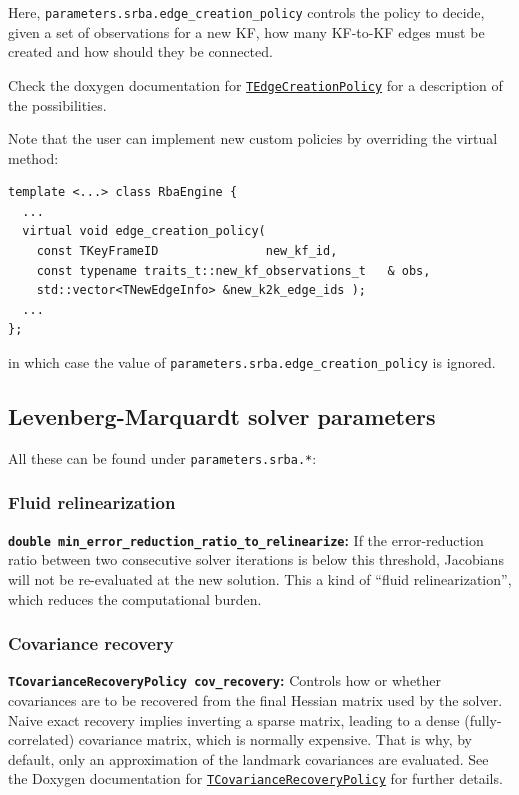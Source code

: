 \documentclass[a4paper,11pt]{article}
\begin{document}
Here, \texttt{parameters.srba.edge\_creation\_policy} controls the policy 
to decide, given a set of observations for a new KF, 
how many KF-to-KF edges must be created and how should they be connected.

Check the doxygen documentation for 
\href{http://reference.mrpt.org/svn/namespacemrpt_1_1srba.html#af0fbe388a6a76d59f66e7b8d1353926c}
{\texttt{TEdgeCreationPolicy}} for a description of the possibilities.

Note that the user can implement new custom policies by overriding the virtual method:

\begin{lstlisting}
template <...> class RbaEngine {
  ...
  virtual void edge_creation_policy(
    const TKeyFrameID               new_kf_id,
    const typename traits_t::new_kf_observations_t   & obs,
    std::vector<TNewEdgeInfo> &new_k2k_edge_ids );
  ...
};
\end{lstlisting}

\noindent in which case the value of 
\texttt{parameters.srba.edge\_creation\_policy}
is ignored.


\newpage
\subsection{Levenberg-Marquardt solver parameters}
\label{sect:lm-params}

All these can be found under
\texttt{parameters.srba.*}:


\subsubsection{Fluid relinearization}

\textbf{\texttt{double min\_error\_reduction\_ratio\_to\_relinearize}:} If the error-reduction ratio 
between two consecutive solver iterations is below this threshold, Jacobians will not be re-evaluated 
at the new solution. This a kind of ``fluid relinearization'', which reduces the computational burden.

\subsubsection{Covariance recovery}

\textbf{\texttt{TCovarianceRecoveryPolicy  cov\_recovery}:} Controls how or whether covariances 
are to be recovered from the final Hessian matrix used by the solver. Naive exact recovery implies 
inverting a sparse matrix, leading to a dense (fully-correlated) covariance matrix, which is normally expensive.
That is why, by default, only an approximation of the landmark covariances are evaluated.
See the Doxygen documentation for 
\href{http://reference.mrpt.org/svn/namespacemrpt_1_1srba.html#a14e4d971f53601c3b72ba1a321e7b9e1}
{\texttt{TCovarianceRecoveryPolicy}}
for further details.
\end{document}
